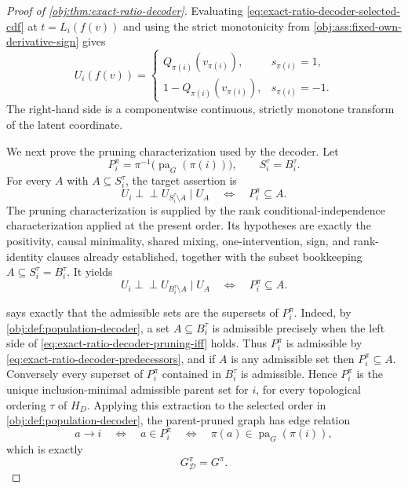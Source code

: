 \documentclass[11pt]{article}
\begin{document}
\begin{proof}[Proof of \cref{obj:thm:exact-ratio-decoder}]
Evaluating \cref{eq:exact-ratio-decoder-selected-cdf} at \(t=L_i(f(v))\) and using the strict monotonicity from \cref{obj:ass:fixed-own-derivative-sign} gives
\begin{equation}
U_i(f(v))
=
\begin{cases}
Q_{\pi(i)}(v_{\pi(i)}), & s_{\pi(i)}=1,\\
1-Q_{\pi(i)}(v_{\pi(i)}), & s_{\pi(i)}=-1.
\end{cases}
\label{eq:exact-ratio-decoder-rank-coordinate}
\end{equation}
The right-hand side is a componentwise continuous, strictly monotone transform of the latent coordinate. %

We next prove the pruning characterization used by the decoder. Let
\[
P_i^\pi=\pi^{-1}\!\bigl(\operatorname{pa}_G(\pi(i))\bigr),
\qquad
S_i^\tau=B_i^\tau.
\]
For every \(A\) with \(A\subseteq S_i^\tau\), the target assertion is
\begin{equation}
U_i\perp\!\!\!\perp U_{S_i^\tau\setminus A}\mid U_A
\quad\Longleftrightarrow\quad
P_i^\pi\subseteq A.
\label{eq:exact-ratio-decoder-pruning-claim}
\end{equation}
The pruning characterization is supplied by the rank conditional-independence characterization applied at the present order. Its hypotheses are exactly the positivity, causal minimality, shared mixing, one-intervention, sign, and rank-identity clauses already established, together with the subset bookkeeping \(A\subseteq S_i^\tau=B_i^\tau\). It yields
\begin{equation}
U_i\perp\!\!\!\perp U_{B_i^\tau\setminus A}\mid U_A
\quad\Longleftrightarrow\quad
P_i^\pi\subseteq A.
\label{eq:exact-ratio-decoder-pruning-iff}
\end{equation}

 says exactly that the admissible sets are the supersets of \(P_i^\pi\). Indeed, by \cref{obj:def:population-decoder}, a set \(A\subseteq B_i^\tau\) is admissible precisely when the left side of \cref{eq:exact-ratio-decoder-pruning-iff} holds. Thus \(P_i^\pi\) is admissible by \cref{eq:exact-ratio-decoder-predecessors}, and if \(A\) is any admissible set then \(P_i^\pi\subseteq A\). Conversely every superset of \(P_i^\pi\) contained in \(B_i^\tau\) is admissible. Hence \(P_i^\pi\) is the unique inclusion-minimal admissible parent set for \(i\), for every topological ordering \(\tau\) of \(H_D\). Applying this extraction to the selected order in \cref{obj:def:population-decoder}, the parent-pruned graph has edge relation
\[
a\to i
\quad\Longleftrightarrow\quad
a\in P_i^\pi
\quad\Longleftrightarrow\quad
\pi(a)\in\operatorname{pa}_G(\pi(i)),
\]
which is exactly
\begin{equation}
G_{\mathscr D}^\pi=G^\pi.
\label{eq:exact-ratio-decoder-selected-graph}
\end{equation}


\end{proof}
\end{document}
